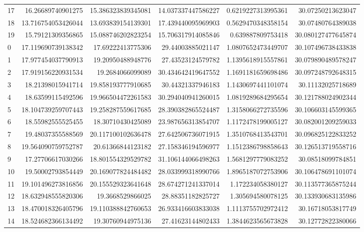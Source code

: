 \begin{tabular}{lrrrrr}
17 & 16.26689740901275 & 15.386323839345081 & 14.037337447586227 & 0.6219227313995361 & 30.07250213623047 \\
18 & 13.716754053426044 & 13.693839154139301 & 17.439440095969903 & 0.5629470348358154 & 30.07480764389038 \\
19 & 15.79121309356865 & 15.088746202823254 & 15.706317914085846 & 0.639887809753418 & 30.080127477645874 \\
0 & 17.119690739138342 & 17.69222413775306 & 29.44003885021147 & 1.0807652473449707 & 30.107496738433838 \\
1 & 17.977454037790913 & 19.20950488948776 & 27.43523124579782 & 1.1395618915557861 & 30.079890489578247 \\
2 & 17.919156220931534 & 19.2684066099089 & 30.434642419647552 & 1.1691181659698486 & 30.097248792648315 \\
3 & 18.21398015941714 & 19.858193777910685 & 30.44321337946183 & 1.1430697441101074 & 30.11132025718689 \\
4 & 18.63599115492596 & 19.966504472261583 & 30.294040941260015 & 1.0819289684295654 & 30.121788024902344 \\
5 & 18.104739259707443 & 19.258287559617685 & 28.390382865524487 & 1.3158066272735596 & 30.106603145599365 \\
6 & 18.55982555525455 & 18.30710430425089 & 23.987656313854707 & 1.1172478199005127 & 30.082001209259033 \\
7 & 19.48037355588569 & 20.117100102636478 & 27.642506736071915 & 1.3510768413543701 & 30.096825122833252 \\
8 & 19.564090759752787 & 20.61366844123182 & 27.158346194596977 & 1.1512386798858643 & 30.126513719558716 \\
9 & 17.27706617030266 & 18.801554329529782 & 31.106144066498263 & 1.5681297779083252 & 30.08518099784851 \\
10 & 19.50002793854449 & 20.169077824484482 & 28.033999318990766 & 1.8965187072753906 & 30.106478691101074 \\
11 & 19.101496273816856 & 20.155529323641648 & 28.674271241337014 & 1.172234058380127 & 30.113577365875244 \\
12 & 18.632948555820306 & 19.3668529866025 & 28.88351182825727 & 1.305694580078125 & 30.133930683135986 \\
13 & 18.470018326405796 & 19.110388842760653 & 26.933416603833038 & 1.1113755702972412 & 30.16718053817749 \\
14 & 18.524682366134492 & 19.30760944975136 & 27.41623144802433 & 1.3844623565673828 & 30.12772822380066 \\

\end{tabular}
